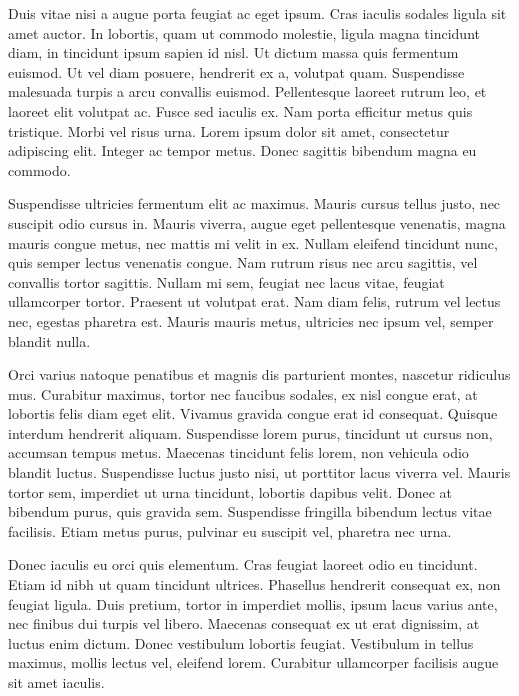 \documentclass{article}
\begin{document}
Duis vitae nisi a augue porta feugiat ac eget ipsum. Cras iaculis sodales ligula sit amet auctor. In lobortis, quam ut commodo molestie, ligula magna tincidunt diam, in tincidunt ipsum sapien id nisl. Ut dictum massa quis fermentum euismod. Ut vel diam posuere, hendrerit ex a, volutpat quam. Suspendisse malesuada turpis a arcu convallis euismod. Pellentesque laoreet rutrum leo, et laoreet elit volutpat ac. Fusce sed iaculis ex. Nam porta efficitur metus quis tristique. Morbi vel risus urna. Lorem ipsum dolor sit amet, consectetur adipiscing elit. Integer ac tempor metus. Donec sagittis bibendum magna eu commodo.

Suspendisse ultricies fermentum elit ac maximus. Mauris cursus tellus justo, nec suscipit odio cursus in. Mauris viverra, augue eget pellentesque venenatis, magna mauris congue metus, nec mattis mi velit in ex. Nullam eleifend tincidunt nunc, quis semper lectus venenatis congue. Nam rutrum risus nec arcu sagittis, vel convallis tortor sagittis. Nullam mi sem, feugiat nec lacus vitae, feugiat ullamcorper tortor. Praesent ut volutpat erat. Nam diam felis, rutrum vel lectus nec, egestas pharetra est. Mauris mauris metus, ultricies nec ipsum vel, semper blandit nulla.

Orci varius natoque penatibus et magnis dis parturient montes, nascetur ridiculus mus. Curabitur maximus, tortor nec faucibus sodales, ex nisl congue erat, at lobortis felis diam eget elit. Vivamus gravida congue erat id consequat. Quisque interdum hendrerit aliquam. Suspendisse lorem purus, tincidunt ut cursus non, accumsan tempus metus. Maecenas tincidunt felis lorem, non vehicula odio blandit luctus. Suspendisse luctus justo nisi, ut porttitor lacus viverra vel. Mauris tortor sem, imperdiet ut urna tincidunt, lobortis dapibus velit. Donec at bibendum purus, quis gravida sem. Suspendisse fringilla bibendum lectus vitae facilisis. Etiam metus purus, pulvinar eu suscipit vel, pharetra nec urna.

Donec iaculis eu orci quis elementum. Cras feugiat laoreet odio eu tincidunt. Etiam id nibh ut quam tincidunt ultrices. Phasellus hendrerit consequat ex, non feugiat ligula. Duis pretium, tortor in imperdiet mollis, ipsum lacus varius ante, nec finibus dui turpis vel libero. Maecenas consequat ex ut erat dignissim, at luctus enim dictum. Donec vestibulum lobortis feugiat. Vestibulum in tellus maximus, mollis lectus vel, eleifend lorem. Curabitur ullamcorper facilisis augue sit amet iaculis.
\end{document}
